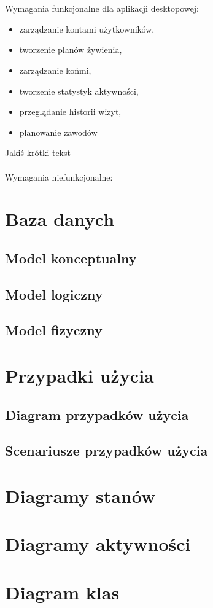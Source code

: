 \documentclass[12pt,twoside]{report}
\begin{document}
\\ \\
Wymagania funkcjonalne dla aplikacji desktopowej:
\begin{itemize}
	\item zarządzanie kontami użytkowników,
	\item tworzenie planów żywienia,
	\item zarządzanie końmi,
	\item tworzenie statystyk aktywności,
	\item przeglądanie historii wizyt,
	\item planowanie zawodów
\end{itemize}
Jakiś krótki tekst
\\ \\
Wymagania niefunkcjonalne:
\newpage
\section{Baza danych}
\subsection{Model konceptualny}
\subsection{Model logiczny}
\subsection{Model fizyczny}
\section{Przypadki użycia}
\subsection{Diagram przypadków użycia}
\subsection{Scenariusze przypadków użycia}
\section{Diagramy stanów}
\section{Diagramy aktywności}
\section{Diagram klas}
\end{document}
